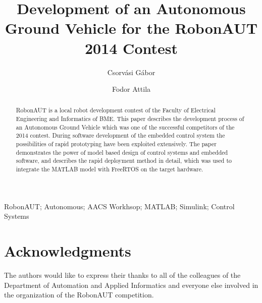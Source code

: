 \documentclass[twoside,b5paper,10pt]{article}
\title{Development of an Autonomous Ground Vehicle for the RobonAUT 2014 Contest}
\author{Csorvási Gábor \and Fodor Attila}
\begin{document}
\makeAutStyleTitle


\begin{abstract}
RobonAUT is a local robot development contest of the Faculty of Electrical Engineering and Informatics of BME. This paper describes the development process of an Autonomous Ground Vehicle which was one of the successful competitors of the 2014 contest. During software development of the embedded control system the possibilities of rapid prototyping have been exploited extensively. The paper demonstrates the power of model based design of control systems and embedded software, and describes the rapid deployment method in detail, which was used to integrate the MATLAB model with FreeRTOS on the target hardware.
\end{abstract}


\begin{keywords}
RobonAUT; Autonomous; AACS Workhsop; MATLAB; Simulink; Control Systems
\end{keywords}






\section*{Acknowledgments}


 { \small The authors would like to express their thanks to all of the colleagues of the Department of Automation and Applied Informatics and everyone else involved in the organization of the RobonAUT competition. }

\appendix


\end{document}
